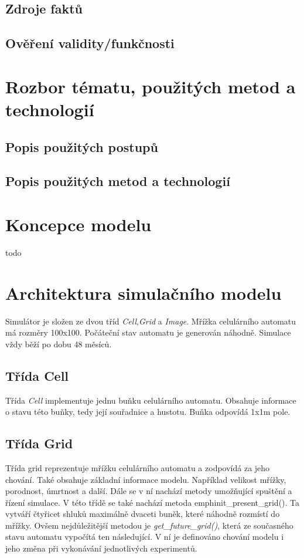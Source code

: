 \documentclass[a4paper,11pt]{article}
\begin{document}
\subsection{Zdroje faktů}

\subsection{Ověření validity/funkčnosti}


\section{Rozbor tématu, použitých metod a technologií}
\subsection{Popis použitých postupů}

\subsection{Popis použitých metod a technologií}


\section{Koncepce modelu}
todo

\section{Architektura simulačního modelu}
Simulátor je složen ze dvou tříd \emph{Cell},\emph{Grid} a \emph{Image}. Mřížka celulárního automatu má rozměry 100x100. Počáteční stav automatu je generován náhodně. Simulace vždy běží po dobu 48 měsíců.

\subsection{Třída Cell}
Třída \emph{Cell} implementuje jednu buňku celulárního automatu. Obsahuje informace o stavu této buňky, tedy její souřadnice a hustotu. Buňka odpovídá 1x1m pole.

\subsection{Třída Grid}
Třída grid reprezentuje mřížku celulárního automatu a zodpovídá za jeho chování. Také obsahuje základní informace modelu. Například velikost mřížky, porodnost, úmrtnost a další. Dále se v ní nachází metody umožňující spuštění a řízení simulace. V této třídě se také nachází metoda emph{init_present_grid()}. Ta vytváří čtyřicet shluků maximálně dvaceti buněk, které náhodně rozmístí do mřížky.
Ovšem nejdůležitější metodou je \emph{get\_future\_grid()}, která ze současného stavu automatu vypočítá ten následující. V ní je definováno chování modelu i jeho změna při vykonávání jednotlivých experimentů.
\end{document}
